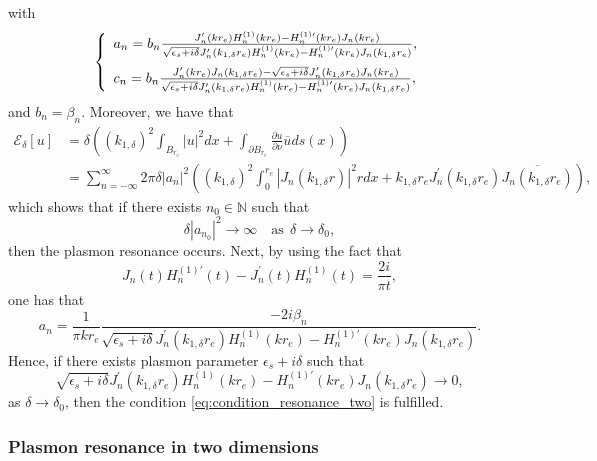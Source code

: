 \documentclass[11pt,reqno,twoside]{amsart}
\theoremstyle{definition}
\theoremstyle{remark}
\numberwithin{equation}{section}
\begin{document}
with
\begin{equation}\label{eq:solution_without_core_two}
  \left\{
    \begin{array}{ll}
  {  a_n=b_n \frac{J_n^{\prime}(kr_e) H_n^{(1)}(kr_e)- H_n^{(1)\prime}(kr_e)J_n(kr_e)} {\sqrt{\epsilon_s+i\delta} J_n^{\prime}(k_{1,\delta} r_e)H_n^{(1)}(kr_e) - H_n^{(1)\prime}(kr_e)J_n(k_{1,\delta} r_e)  }},\medskip\\
  {  c_n=b_n \frac{J_n^{\prime}(kr_e) J_n(k_{1,\delta} r_e) -\sqrt{\epsilon_s+i\delta}J_n^{\prime}(k_{1,\delta} r_e)J_n(kr_e)}{\sqrt{\epsilon_s+i\delta} J_n^{\prime}(k_{1,\delta} r_e)H_n^{(1)}(kr_e) - H_n^{(1)\prime}(kr_e)J_n(k_{1,\delta} r_e)  },}
    \end{array}
  \right.
\end{equation}
and $b_n=\beta_n$. Moreover, we have that
\begin{equation}
 \begin{split}
   \mathscr{E}_{\delta}[u] & = \delta \left( (k_{1,\delta})^2\int_{B_{r_e}}|u|^2 dx + \int_{\partial B_{r_e}}\frac{\partial u}{\partial\nu}\overline{u} ds(x)\right) \\
     & =\sum_{n=-\infty}^{\infty}2\pi\delta |a_n|^2 \left( (k_{1,\delta})^2\int_{0}^{r_e}|J_n(k_{1,\delta}r)|^2 r dx + k_{1,\delta}r_eJ_n^{\prime}(k_{1,\delta}r_e)\overline{J_n(k_{1,\delta}r_e)} \right),
 \end{split}
\end{equation}
which shows that if there exists $n_0\in\mathbb{N}$ such that
\begin{equation}\label{eq:condition_resonance_two}
 \delta |a_{n_0}|^2\rightarrow \infty\quad\mbox{as}\ \ \delta\rightarrow\delta_0,
\end{equation}
then the plasmon resonance occurs. Next, by using the fact that
 \[
  J_n(t)H_n^{(1)\prime}(t)-J_n^{\prime}(t)H_n^{(1)}(t)=\frac{2i}{\pi t},
\]
one has that
\[
   a_n=\frac{1}{\pi kr_e} \frac{-2i \beta_n} {\sqrt{\epsilon_s+i\delta} J_n^{\prime}(k_{1,\delta} r_e)H_n^{(1)}(kr_e) - H_n^{(1)\prime}(kr_e)J_n(k_{1,\delta} r_e)  }.
\]
Hence, if there exists plasmon parameter $\epsilon_s+i\delta$ such that
\begin{equation}\label{eq:fourier_resonance_two}
  \sqrt{\epsilon_s+i\delta} J_n^{\prime}(k_{1,\delta} r_e)H_n^{(1)}(kr_e) - H_n^{(1)\prime}(kr_e)J_n(k_{1,\delta} r_e)\rightarrow 0,
\end{equation}
as $\delta\rightarrow \delta_0$, then the condition \eqref{eq:condition_resonance_two} is fulfilled. 

\subsubsection{Plasmon resonance in two dimensions}
\end{document}
